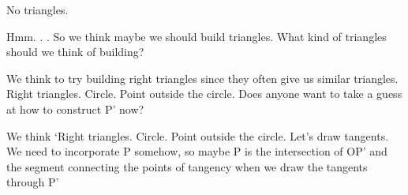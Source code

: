 




No triangles.

Hmm. . .  So we think maybe we should build triangles.  What kind of triangles should we think of building?







We think to try building right triangles since they often give us similar triangles.  Right triangles.  Circle.  Point outside the circle.  Does anyone want to take a guess at how to construct P' now?


We think `Right triangles.  Circle.  Point outside the circle.  Let's draw tangents.  We need to incorporate P somehow, so maybe P is the intersection of OP' and the segment connecting the points of tangency when we draw the tangents through P'


